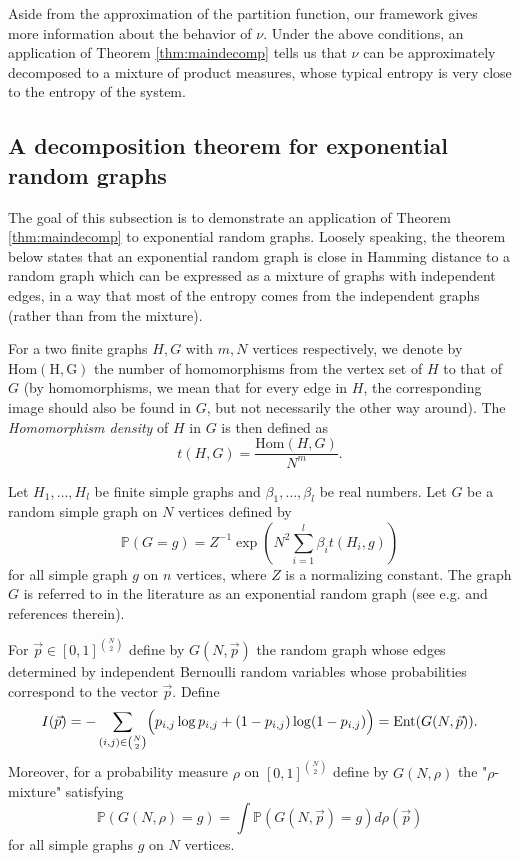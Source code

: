 \documentclass[12pt]{article}
\def \PP {\mathbb P}
\def \Ent {\mathrm{Ent}}
\theoremstyle{definition}
\theoremstyle{remark}
\begin{document}
Aside from the approximation of the partition function, our framework gives more information about the behavior of $\nu$. Under the above conditions, an application of Theorem \ref{thm:maindecomp} tells us that $\nu$ can be approximately decomposed to a mixture of product measures, whose typical entropy is very close to the entropy of the system. 

\subsection{A decomposition theorem for exponential random graphs} \label{sec:expgraphs}

The goal of this subsection is to demonstrate an application of Theorem \ref{thm:maindecomp} to exponential random graphs. Loosely speaking, the theorem below states that an exponential random graph is close in Hamming distance to a random graph which can be expressed as a mixture of graphs with independent edges, in a way that most of the entropy comes from the independent graphs (rather than from the mixture).

For a two finite graphs $H,G$ with $m,N$ vertices respectively, we denote by $\mathrm{Hom(H,G)}$ the number of homomorphisms from the vertex set of $H$ to that of $G$ (by homomorphisms, we mean that for every edge in $H$, the corresponding image should also be found in $G$, but not necessarily the other way around). The \emph{Homomorphism density} of $H$ in $G$ is then defined as
$$
t(H,G) = \frac{ \mathrm{Hom}(H,G)}{N^m}.
$$

Let $H_1,\dots,H_l$ be finite simple graphs and $\beta_1,\dots,\beta_l$ be real numbers. Let $G$ be a random simple graph on $N$ vertices defined by
\begin{equation}\label{eq:defexpgraph}
\PP(G = g) = Z^{-1} \exp \left (N^2 \sum_{i=1}^l \beta_i t(H_i,g) \right )
\end{equation}
for all simple graph $g$ on $n$ vertices, where $Z$ is a normalizing constant. The graph $G$ is referred to in the literature as an exponential random graph (see e.g. \cite{CDExponential} and references therein).

For $\vec{p} \in [0,1]^{{N \choose 2}}$ define by $G(N,\vec{p})$ the random graph whose edges determined by independent Bernoulli random variables whose probabilities correspond to the vector $\vec p$. Define 
$$
I(\vec p) = - \sum_{(i,j) \in {N \choose 2}} \Bigl ( p_{i,j} \log p_{i,j} + (1-p_{i,j}) \log (1-p_{i,j}) \Bigr ) = \Ent(G(N, \vec{p})).
$$
Moreover, for a probability measure $\rho$ on $[0,1]^{{N \choose 2}}$ define by $G(N, \rho)$ the "$\rho$-mixture" satisfying
$$
\PP(G(N,\rho) = g) = \int  \PP(G(N,\vec p) = g) d \rho(\vec p)
$$
for all simple graphs $g$ on $N$ vertices.
\end{document}
